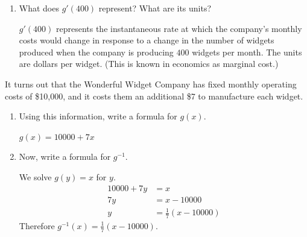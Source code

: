 \documentclass{article}
\begin{document}
\begin{enumerate}
\begin{enumerate}
  \item
    \begin{problem}[\vfill]
      What does $g'(400)$ represent?  What are its units?
    \end{problem}

    \begin{solution}
      $g'(400)$ represents the instantaneous rate at which the company's monthly costs
      would change in response to a change in the number of widgets produced
      when the company is producing
      $400$ widgets per month. The units are dollars per widget. (This is known
      in economics as marginal cost.)
    \end{solution}

  \end{enumerate}
  It turns out that the Wonderful Widget Company has fixed monthly operating costs of \$10,000, and it costs them an additional \$7 to manufacture each widget.
  \begin{enumerate}[resume]
  \item
    \begin{problem}[\vfill]
      Using this information, write a formula for $g(x)$.
    \end{problem}

    \begin{solution}
      $g(x)=10000+7x$
    \end{solution}

  \item
    \begin{problem}[\vfill\newpage]
      Now, write a formula for $g^{-1}$. 
    \end{problem}

    \begin{solution}
      We solve $g(y)=x$ for $y$.
      \begin{align*}
        10000+7y &= x \\
        7y &= x-10000\\
        y &= \tfrac{1}{7}(x-10000)
      \end{align*}
      Therefore $g^{-1}(x) = \tfrac{1}{7}(x-10000)$.
    \end{solution}

  \end{enumerate}

\end{enumerate}
\end{document}
